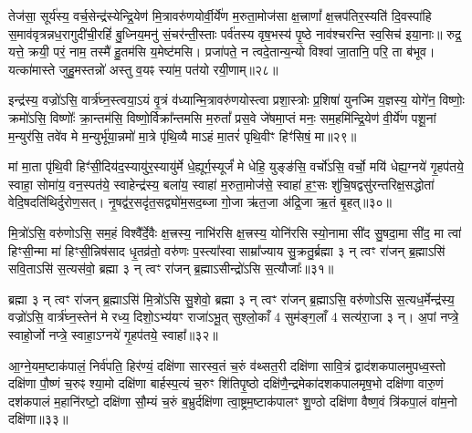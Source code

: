 तेज॑सा॒ सूर्य॑स्य॒ वर्च॒सेन्द्र॑स्येन्द्रि॒येण॑ मि॒त्रावरु॑णयोर्वी॒र्ये॑ण म॒रुता॒मोज॑सा क्ष॒त्त्राणां᳚ क्ष॒त्त्रप॑तिर॒स्यति॑ दि॒वस्पा॑हि स॒माव॑वृत्रन्नध॒रागुदी॑ची॒रहिं॑ बु॒ध्निय॒मनु॑ सं॒चर॑न्ती॒स्ताः पर्व॑तस्य वृष॒भस्य॑ पृ॒ष्ठे नाव॑श्चरन्ति स्व॒सिच॑ इया॒नाः॥ रुद्र॒ यत्ते॒ क्रयी॒ परं॒ नाम॒ तस्मै॑ हु॒तम॑सि य॒मेष्ट॑मसि। प्रजा॑पते॒ न त्वदे॒तान्य॒न्यो विश्वा॑ जा॒तानि॒ परि॒ ता ब॑भूव। यत्का॑मास्ते जुहु॒मस्तन्नो॑ अस्तु व॒यꣴ स्या॑म॒ पत॑यो रयी॒णाम्॥२८॥

{\anuvakamend[{अ॒ग्नेस्तैका॑दश च॥14॥}]}

इन्द्र॑स्य॒ वज्रो॑\-ऽसि॒ वार्त्र॑घ्न॒स्त्वया॒\-ऽयं वृ॒त्रं व॑ध्यान्मि॒त्रावरु॑णयोस्त्वा प्रशा॒स्त्रोः प्र॒शिषा॑ युनज्मि य॒ज्ञस्य॒ योगे॑न॒ विष्णोः॒ क्रमो॑\-ऽसि॒ विष्णोः᳚ क्रा॒न्तम॑सि॒ विष्णो॒र्विक्रा᳚न्तमसि म॒रुतां᳚ प्रस॒वे जे॑षमा॒प्तं मनः॒ सम॒हमि॑न्द्रि॒येण॑ वी॒र्ये॑ण पशू॒नां म॒न्युर॑सि॒ तवे॑व मे म॒न्युर्भू॑या॒न्नमो॑ मा॒त्रे पृ॑थि॒व्यै मा\-ऽहं मा॒तरं॑ पृथि॒वीꣳ हिꣳ॑सिषं॒ मा॥२९॥

मां मा॒ता पृ॑थि॒वी हिꣳ॑सी॒दिय॑द॒स्यायु॑र॒स्यायु॑र्मे धे॒ह्यूर्ग॒स्यूर्जं॑ मे धेहि॒ युङ्ङ॑सि॒ वर्चो॑\-ऽसि॒ वर्चो॒ मयि॑ धेह्य॒ग्नये॑ गृ॒हप॑तये॒ स्वाहा॒ सोमा॑य॒ वन॒स्पत॑ये॒ स्वाहेन्द्र॑स्य॒ बला॑य॒ स्वाहा॑ म॒रुता॒मोज॑से॒ स्वाहा॑ ह॒ꣳ॒सः शु॑चि॒षद्वसु॑रन्तरिक्ष॒\-सद्धोता॑ वेदि॒षदति॑थिर्दुरोण॒सत्। नृ॒षद्व॑र॒सदृ॑त॒सद्व्यो॑म॒सद॒ब्जा गो॒जा ऋ॑त॒जा अ॑द्रि॒जा ऋ॒तं बृ॒हत्॥३०॥

{\anuvakamend[{हि॒ꣳ॒सि॒षं॒ मर्त॒जास्त्रीणि॑ च॥15॥}]}

मि॒त्रो॑\-ऽसि॒ वरु॑णो\-ऽसि॒ सम॒हं विश्वै᳚र्दे॒वैः क्ष॒त्त्रस्य॒ नाभि॑रसि क्ष॒त्त्रस्य॒ योनि॑रसि स्यो॒नामा सी॑द सु॒षदा॒मा सी॑द॒ मा त्वा॑ हिꣳसी॒न्मा मा॑ हिꣳसी॒न्निष॑साद धृ॒तव्र॑तो॒ वरु॑णः प॒स्त्या᳚स्वा साम्रा᳚ज्याय सु॒क्रतु॒र्ब्रह्मा ३ न् त्वꣳ रा॑जन् ब्र॒ह्मा\-ऽसि॑ सवि॒ता\-ऽसि॑ स॒त्यस॑वो॒ ब्रह्मा ३ न् त्वꣳ रा॑जन् ब्र॒ह्मा\-ऽसीन्द्रो॑\-ऽसि स॒त्यौजाः᳚॥३१॥

ब्रह्मा ३ न् त्वꣳ रा॑जन् ब्र॒ह्मा\-ऽसि॑ मि॒त्रो॑\-ऽसि सु॒शेवो॒ ब्रह्मा ३ न् त्वꣳ रा॑जन् ब्र॒ह्मा\-ऽसि॒ वरु॑णो\-ऽसि स॒त्यध॒र्मेन्द्र॑स्य॒ वज्रो॑\-ऽसि॒ वार्त्र॑घ्न॒स्तेन॑ मे रध्य॒ दिशो॒\-ऽभ्य॑यꣳ राजा॑\-ऽभू॒त् सुश्लो॒काँ 4 सुम॑ङ्ग॒लाँ 4 सत्य॑रा॒जा ३ न्। अ॒पां नप्त्रे॒ स्वाहो॒र्जो नप्त्रे॒ स्वाहा॒\-ऽग्नये॑ गृ॒हप॑तये॒ स्वाहा᳚॥३२॥

{\anuvakamend[{स॒त्यौजा᳚श्चत्वारि॒ꣳ॒शच्च॑॥16॥}]}

आ॒ग्ने॒यम॒ष्टाक॑पालं॒ निर्व॑पति॒ हिर॑ण्यं॒ दक्षि॑णा सारस्व॒तं च॒रुं व॑थ्सत॒री दक्षि॑णा सावि॒त्रं द्वाद॑शकपालमुपध्व॒स्तो दक्षि॑णा पौ॒ष्णं च॒रुꣴ श्या॒मो दक्षि॑णा बार्\mbox{}हस्प॒त्यं च॒रुꣳ शि॑तिपृ॒ष्ठो दक्षि॑णै॒न्द्रमेका॑दशकपालमृष॒भो दक्षि॑णा वारु॒णं दश॑कपालं म॒हानि॑रष्टो॒ दक्षि॑णा सौ॒म्यं च॒रुं ब॒भ्रुर्दक्षि॑णा त्वा॒ष्ट्रम॒ष्टाक॑पालꣳ शु॒ण्ठो दक्षि॑णा वैष्ण॒वं त्रि॑कपा॒लं वा॑म॒नो दक्षि॑णा॥३३॥

